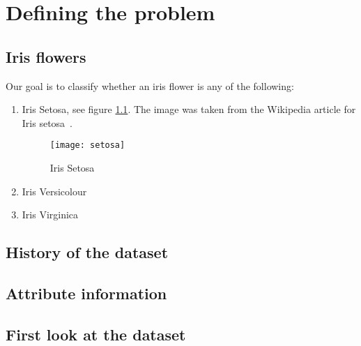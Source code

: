 \chapter{Defining the problem}

\section{Iris flowers}
Our goal is to classify whether an iris flower is any of the following:

\begin{enumerate}
    \item Iris Setosa, see figure \ref{fig:setosa}. The image was taken from the Wikipedia article for Iris setosa~\cite{setosa}.
    \begin{figure}
        \centering
        \texttt{[image: setosa]}
        \caption{Iris Setosa}
        \label{fig:setosa}
    \end{figure}
    \item Iris Versicolour
    \item Iris Virginica
\end{enumerate}

\section{History of the dataset}
\section{Attribute information}
\section{First look at the dataset}